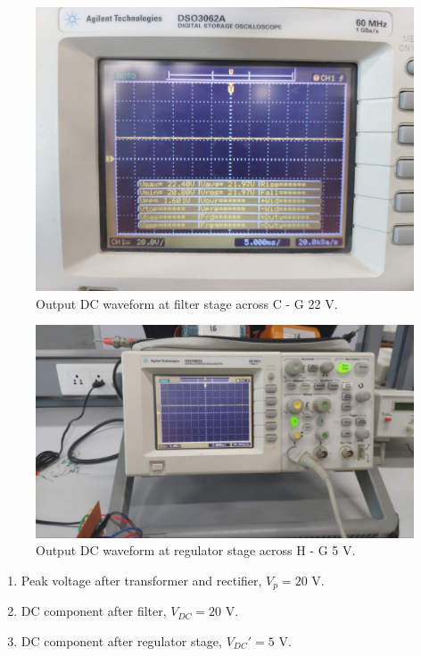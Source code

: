 \documentclass[journal,12pt,twocolumn]{IEEEtran}
\begin{document}
	\begin{figure}[!ht]
		\includegraphics[width=\columnwidth]{figs/capout.jpg}
		\caption{Output DC waveform at filter stage across C - G 22 V.}
		\label{fig:filter}
	\end{figure}
	
	\begin{figure}[!ht]
		\includegraphics[width=\columnwidth]{figs/final_op.jpg}
		\caption{Output DC waveform at regulator stage across H - G 5 V.}
		\label{fig:regulator_dc}
	\end{figure}
	
	
	\begin{enumerate}
		\item Peak voltage after transformer and rectifier, 
		$V_p = 20$ V.
		\item DC component after filter, 
		$V_{DC} = 20$ V.
		\item DC component after regulator stage, $V_{DC}' = 5$ V.
	\end{enumerate}
\end{document}
